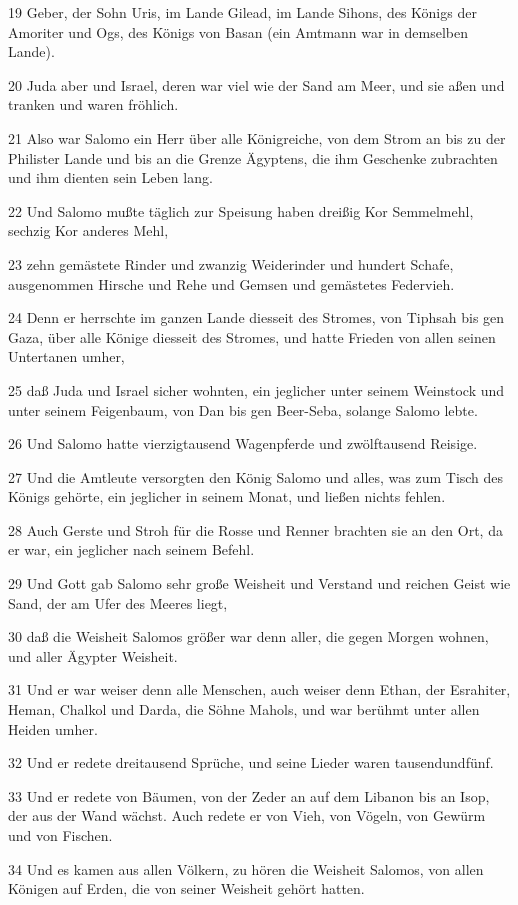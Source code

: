 \par 19 Geber, der Sohn Uris, im Lande Gilead, im Lande Sihons, des Königs der Amoriter und Ogs, des Königs von Basan (ein Amtmann war in demselben Lande).
\par 20 Juda aber und Israel, deren war viel wie der Sand am Meer, und sie aßen und tranken und waren fröhlich.
\par 21 Also war Salomo ein Herr über alle Königreiche, von dem Strom an bis zu der Philister Lande und bis an die Grenze Ägyptens, die ihm Geschenke zubrachten und ihm dienten sein Leben lang.
\par 22 Und Salomo mußte täglich zur Speisung haben dreißig Kor Semmelmehl, sechzig Kor anderes Mehl,
\par 23 zehn gemästete Rinder und zwanzig Weiderinder und hundert Schafe, ausgenommen Hirsche und Rehe und Gemsen und gemästetes Federvieh.
\par 24 Denn er herrschte im ganzen Lande diesseit des Stromes, von Tiphsah bis gen Gaza, über alle Könige diesseit des Stromes, und hatte Frieden von allen seinen Untertanen umher,
\par 25 daß Juda und Israel sicher wohnten, ein jeglicher unter seinem Weinstock und unter seinem Feigenbaum, von Dan bis gen Beer-Seba, solange Salomo lebte.
\par 26 Und Salomo hatte vierzigtausend Wagenpferde und zwölftausend Reisige.
\par 27 Und die Amtleute versorgten den König Salomo und alles, was zum Tisch des Königs gehörte, ein jeglicher in seinem Monat, und ließen nichts fehlen.
\par 28 Auch Gerste und Stroh für die Rosse und Renner brachten sie an den Ort, da er war, ein jeglicher nach seinem Befehl.
\par 29 Und Gott gab Salomo sehr große Weisheit und Verstand und reichen Geist wie Sand, der am Ufer des Meeres liegt,
\par 30 daß die Weisheit Salomos größer war denn aller, die gegen Morgen wohnen, und aller Ägypter Weisheit.
\par 31 Und er war weiser denn alle Menschen, auch weiser denn Ethan, der Esrahiter, Heman, Chalkol und Darda, die Söhne Mahols, und war berühmt unter allen Heiden umher.
\par 32 Und er redete dreitausend Sprüche, und seine Lieder waren tausendundfünf.
\par 33 Und er redete von Bäumen, von der Zeder an auf dem Libanon bis an Isop, der aus der Wand wächst. Auch redete er von Vieh, von Vögeln, von Gewürm und von Fischen.
\par 34 Und es kamen aus allen Völkern, zu hören die Weisheit Salomos, von allen Königen auf Erden, die von seiner Weisheit gehört hatten.

